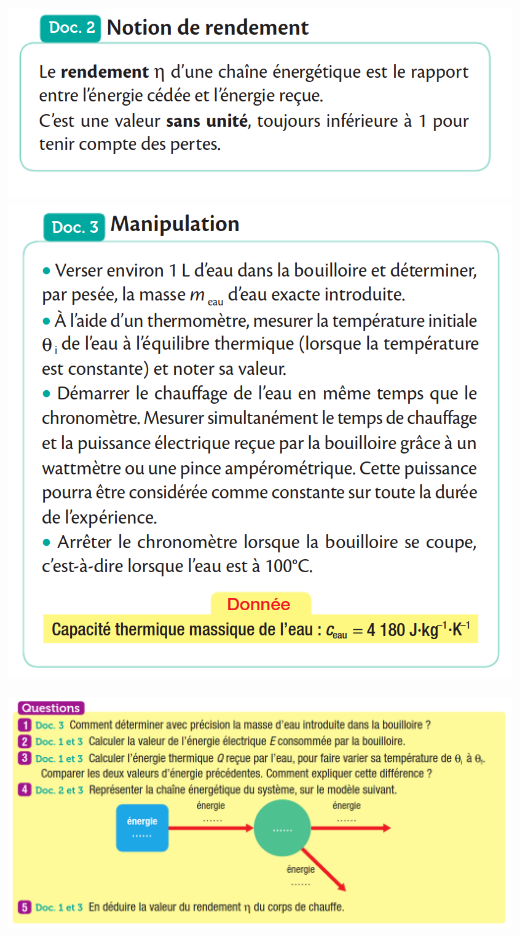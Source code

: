 \documentclass[10pt]{article}
\begin{document}
\begin{minipage}[c]{0.45\textwidth}
	\centering
	\includegraphics[scale=0.36]{assets/doc2.png}
	\includegraphics[scale=0.36]{assets/doc3.png}
\end{minipage}

\includegraphics[scale=0.36]{assets/q.png}


\end{document}
